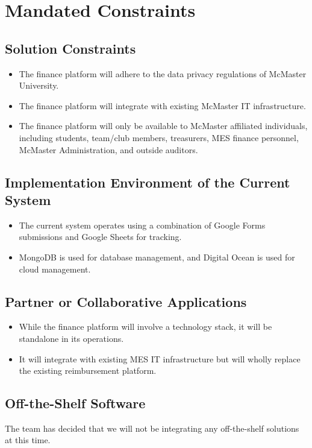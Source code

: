 \documentclass[12pt]{article}
\begin{document}
\section{Mandated Constraints}
\subsection{Solution Constraints}
\begin{itemize}
    \item The finance platform will adhere to the data privacy regulations of McMaster University.
    \item The finance platform will integrate with existing McMaster IT infrastructure.
    \item The finance platform will only be available to McMaster affiliated individuals, including students, team/club members, treasurers, MES finance personnel, McMaster Administration, and outside auditors.
\end{itemize}

\subsection{Implementation Environment of the Current System}
\begin{itemize}
    \item The current system operates using a combination of Google Forms submissions and Google Sheets for tracking. 
    \item MongoDB is used for database management, and Digital Ocean is used for cloud management.
\end{itemize}

\subsection{Partner or Collaborative Applications}
\begin{itemize}
    \item While the finance platform will involve a technology stack, it will be standalone in its operations.
    \item It will integrate with existing MES IT infrastructure but will wholly replace the existing reimbursement platform.
\end{itemize}
 

\subsection{Off-the-Shelf Software}
The team has decided that we will not be integrating any off-the-shelf solutions at this time.
\end{document}
